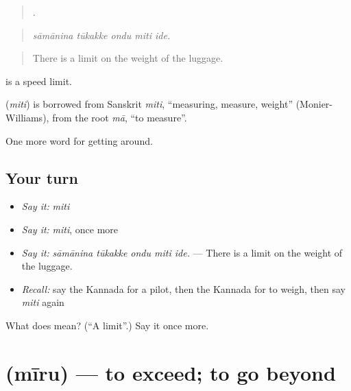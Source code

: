 \begin{quote}
    .
\end{quote}

\begin{quote}
\emph{sāmānina tūkakke ondu miti ide.}
\end{quote}

\begin{quote}
There is a limit on the weight of the luggage.
\end{quote}

  is a speed limit.

\begin{cousinweb}
\textbf{} (\emph{miti}) is borrowed from Sanskrit \emph{miti}, \textquotedblleft{}measuring, measure, weight\textquotedblright{} (Monier-Williams), from the root \emph{mā}, \textquotedblleft{}to measure\textquotedblright{}.
\end{cousinweb}

\begin{grammarlens}[title={What you've built}]
One more word for getting around.
\end{grammarlens}

\subsection*{Your turn}
\begin{itemize}
\raggedright
  \item \emph{Say it:} \emph{miti}
  \item \emph{Say it:} \emph{miti}, once more
  \item \emph{Say it:} \emph{sāmānina tūkakke ondu miti ide.} — There is a limit on the weight of the luggage.
  \item \emph{Recall:} say the Kannada for a pilot, then the Kannada for to weigh, then say \emph{miti} again
\end{itemize}

\begin{tcolorbox}[breakable,colback=teal!4,colframe=teal!35!black,title={Before you move on}]
What does  mean? (\textquotedblleft{}A limit\textquotedblright{}.) Say it once more.
\end{tcolorbox}
\section[\texorpdfstring{\kn{ಮೀರು} (mīru)}{ಮೀರು (mīru)}]{ (mīru) — to exceed; to go beyond}

